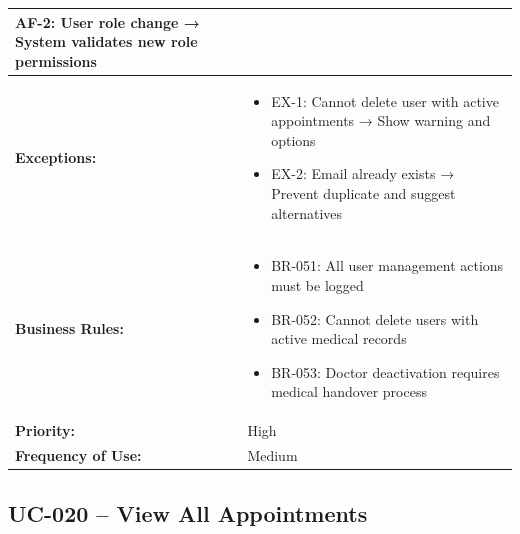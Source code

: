 \documentclass[12pt,a4paper]{article}
\begin{document}
\begin{longtable}{|p{4.5cm}|p{10.5cm}|}
\textbf{AF-2:} User role change → System validates new role permissions \\
\hline
\textbf{Exceptions:} &
\begin{itemize}
  \item EX-1: Cannot delete user with active appointments → Show warning and options
  \item EX-2: Email already exists → Prevent duplicate and suggest alternatives
\end{itemize} \\
\hline
\textbf{Business Rules:} &
\begin{itemize}
  \item BR-051: All user management actions must be logged
  \item BR-052: Cannot delete users with active medical records
  \item BR-053: Doctor deactivation requires medical handover process
\end{itemize} \\
\hline
\textbf{Priority:} & High \\
\hline
\textbf{Frequency of Use:} & Medium \\
\hline
\end{longtable}

\subsection{UC-020 – View All Appointments}
\end{document}
